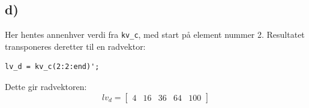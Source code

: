 \subsection*{d)}
Her hentes annenhver verdi fra \texttt{kv\_c}, med start på
element nummer 2. Resultatet transponeres deretter til en radvektor:
\begin{verbatim}
lv_d = kv_c(2:2:end)';
\end{verbatim}
Dette gir radvektoren: 
\[
    lv_d = \begin{bmatrix}
            4 & 16 & 36 & 64 & 100
        \end{bmatrix}
\]